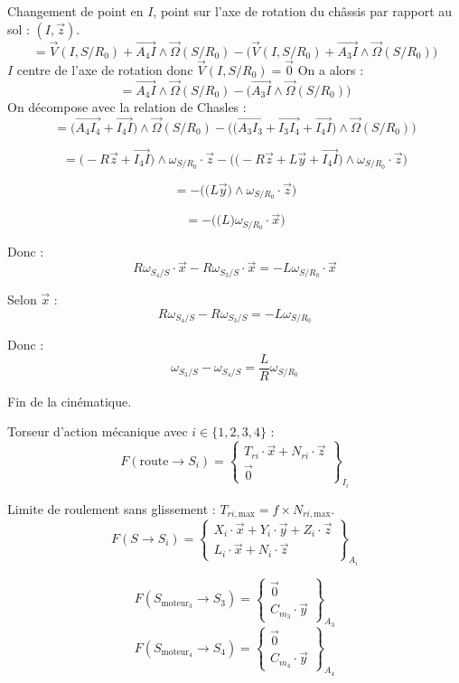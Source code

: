 \documentclass[a4paper,12pt]{report}  %
\begin{document}
Changement de point en $I$, point sur l'axe de rotation du châssis par rapport au sol : $(I,\vec{z})$. 
$$= 
\vec{V}(I, S/R_0) + \overrightarrow{A_4 I} \wedge \vec{\Omega}(S/R_0) 
- \bigg(\vec{V}(I, S/R_0) + \overrightarrow{A_3 I} \wedge \vec{\Omega}(S/R_0) \bigg)
$$
$I$ centre de l'axe de rotation donc $\vec{V}(I, S/R_0) = \vec0$
On a alors : 
$$
= \overrightarrow{A_4 I} \wedge \vec{\Omega}(S/R_0) 
- \bigg( \overrightarrow{A_3 I} \wedge \vec{\Omega}(S/R_0) \bigg)$$
On décompose avec la relation de Chasles : 
$$
= 
\bigg(\overrightarrow{A_4 I_4}+\overrightarrow{I_4 I} \bigg)
\wedge \vec{\Omega}(S/R_0) 
- 
\Bigg( 
\bigg(
\overrightarrow{A_3 I_3} 
+ \overrightarrow{I_3 I_4} 
+ \overrightarrow{I_4 I}
\bigg) 
\wedge \vec{\Omega}(S/R_0) 
\Bigg)
$$

$$
= 
\bigg( -R\vec{z}+\overrightarrow{I_4 I} \bigg)
\wedge {\omega}_{S/R_0} \cdot \vec{z} 
- 
\Bigg( 
\bigg( 
-R\vec{z} + L\vec{y} +\overrightarrow{I_4I}
\bigg) 
\wedge {\omega}_{S/R_0} \cdot \vec{z}  
\Bigg)
$$

$$
= 
- 
\Bigg( 
\bigg( 
L\vec{y} 
\bigg) 
\wedge {\omega}_{S/R_0} \cdot \vec{z}  
\Bigg)
$$

$$
= 
- 
\Bigg( 
\bigg( 
L
\bigg) 
{\omega}_{S/R_0}
\cdot \vec{x}
\Bigg)
$$

Donc : 
$$
R\omega_{S_4/S} \cdot \vec{x} - R\omega_{S_3/S} \cdot \vec{x}
=
-L {\omega}_{S/R_0} \cdot \vec{x}
$$

Selon $\vec{x}$ : 
$$
R\omega_{S_4/S} - R\omega_{S_3/S} 
=
-L {\omega}_{S/R_0} 
$$

Donc : 
$$
\boxed{
	\omega_{S_3/S} - \omega_{S_4/S} 
	=
	\frac{L}{R} {\omega}_{S/R_0}
}
$$

Fin de la cinématique. 

Torseur d'action mécanique avec $i \in \{1,2,3,4\}$ : 
$$
F(\text{route} \to S_i) = 
\begin{Bmatrix}
	T_{ri} \cdot \vec{x} + N_{ri} \cdot \vec{z} 
	\\
	\vec0
\end{Bmatrix}_{I_{i}}
$$

Limite de roulement sans glissement : $T_{ri,\text{max}} = f \times N_{ri, \text{max}}$. 
$$
F(S \to S_i) = 
\begin{Bmatrix}
	X_i \cdot \vec{x} + Y_i \cdot \vec{y} + Z_i \cdot \vec{z} \\
	L_i \cdot \vec{x} + N_i \cdot \vec{z}
\end{Bmatrix}_{A_{i}}
$$


$$
F(S_{\text{moteur}_3}\to S_3) = 
\begin{Bmatrix}
	\vec{0} \\
	C_{m_3} \cdot \vec{y} 
\end{Bmatrix}_{A_{3}}
$$
$$
F(S_{\text{moteur}_4}\to S_4) = 
\begin{Bmatrix}
	\vec{0} \\
	C_{m_4} \cdot \vec{y} 
\end{Bmatrix}_{A_{4}}
$$
\end{document}
